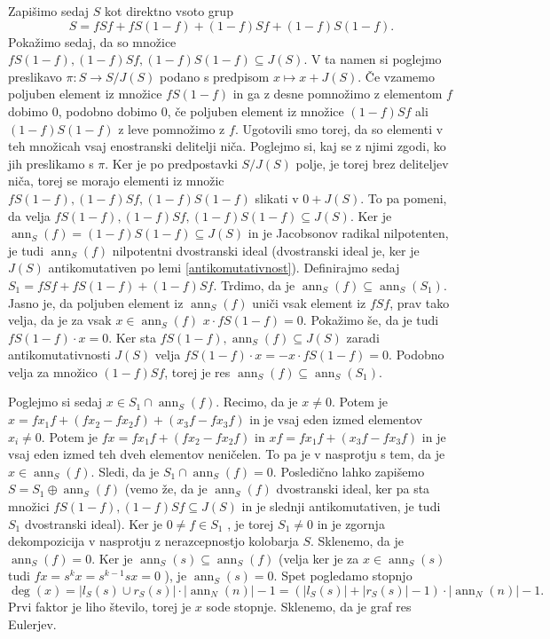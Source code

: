 \documentclass[a4paper, 12pt]{amsart}
\theoremstyle{definition} %
\theoremstyle{plain} %
\DeclareMathOperator{\ann}{ann}
\begin{document}
Zapišimo sedaj $S$ kot direktno vsoto grup
$$
S = fSf + fS(1-f) + (1-f)Sf + (1-f)S(1-f).
$$
Pokažimo sedaj, da so množice  $fS(1-f), (1-f)Sf, (1-f)S(1-f) \subseteq J(S)$. V ta namen si poglejmo preslikavo $\pi : S \rightarrow S/J(S)$ podano s predpisom $x\mapsto x+J(S)$. Če vzamemo poljuben element iz množice $fS(1-f)$ in ga z desne pomnožimo z elementom $f$ dobimo 0, podobno dobimo 0, če poljuben element iz množice $(1-f)Sf$ ali $(1-f)S(1-f)$ z leve pomnožimo z $f$. Ugotovili smo torej, da so elementi v teh množicah vsaj enostranski delitelji niča. Poglejmo si, kaj se z njimi zgodi, ko jih preslikamo s $\pi$. Ker je po predpostavki $S/J(S)$ polje, je torej brez deliteljev niča, torej se morajo elementi iz množic $fS(1-f), (1-f)Sf, (1-f)S(1-f)$ slikati v $0+J(S)$. To pa pomeni, da velja $fS(1-f), (1-f)Sf, (1-f)S(1-f) \subseteq J(S)$. Ker je $\ann_S(f) = (1-f)S(1-f) \subseteq J(S)$ in je Jacobsonov radikal nilpotenten, je tudi $\ann_S(f)$ nilpotentni dvostranski ideal (dvostranski ideal je, ker je $J(S)$ antikomutativen po lemi \ref{antikomutativnost}). Definirajmo sedaj $S_1 = fSf + fS(1-f) + (1-f)Sf$. Trdimo, da je $\ann_S(f) \subseteq \ann_S(S_1)$. Jasno je, da poljuben element iz $\ann_S(f)$ uniči vsak element iz $fSf$, prav tako velja, da je za vsak $x\in \ann_S(f)$ $x\cdot fS(1-f) = 0$. Pokažimo še, da je tudi $fS(1-f) \cdot x = 0$. Ker sta $fS(1-f), \ann_S(f)\subseteq J(S)$ zaradi antikomutativnosti $J(S)$ velja $fS(1-f) \cdot x = - x\cdot fS(1-f) = 0$. Podobno velja za množico $(1-f)Sf$, torej je res $\ann_S(f) \subseteq \ann_S(S_1)$. 

Poglejmo si sedaj $x\in S_1 \cap \ann_S(f) $. Recimo, da je $x\neq0 $. Potem je $x = fx_1 f + (fx_2 - fx_2 f) + (x_3 f - fx_3 f)$ in je vsaj eden izmed elementov $x_i \neq 0$. Potem je $fx = fx_1 f + (fx_2 - fx_2 f ) $ in $xf = fx_1f + (x_3f - fx_3f)$ in je vsaj eden izmed teh dveh elementov neničelen. To pa je v nasprotju s tem, da je $x\in \ann_S(f)$. Sledi, da je $S_1 \cap \ann_S(f) = 0$. Posledično lahko zapišemo $S = S_1 \oplus \ann_S(f)$ (vemo že, da je $\ann_S(f)$ dvostranski ideal, ker pa sta množici $fS(1-f),(1-f)Sf \subseteq J(S) $ in je slednji antikomutativen, je tudi $S_1$ dvostranski ideal). Ker je $0\neq f\in S_1$ , je torej $S_1\neq 0$ in je zgornja dekompozicija v nasprotju z nerazcepnostjo kolobarja $S$. Sklenemo, da je $\ann_S(f) = 0$. Ker je $\ann_S(s) \subseteq \ann_S(f)$ (velja ker je za $x\in \ann_S(s)$ tudi $fx = s^k x = s^{k-1 } sx = 0$ ), je $\ann_S(s) = 0$. Spet pogledamo stopnjo
$$
\deg(x) = |l_S(s) \cup r_S(s)|\cdot |\ann_N(n)|-1 = (|l_S(s) | + |r_S(s)|-1)\cdot |\ann_N(n)| - 1.
$$
Prvi faktor je liho število, torej je $x$ sode stopnje. Sklenemo, da je graf res Eulerjev.
\end{document}
